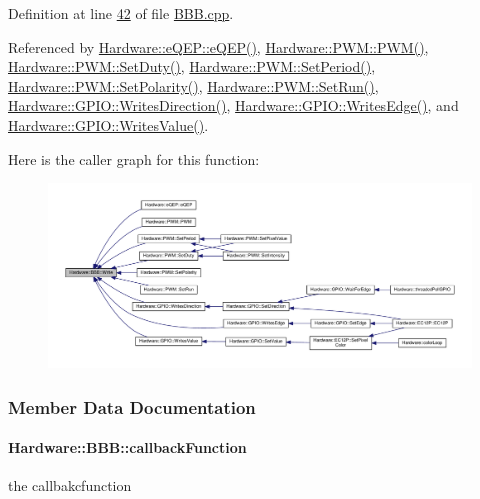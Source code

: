 Definition at line \hyperlink{_b_b_b_8cpp_source_l00042}{42} of file \hyperlink{_b_b_b_8cpp_source}{B\+B\+B.\+cpp}.



Referenced by \hyperlink{eqep_8cpp_source_l00042}{Hardware\+::e\+Q\+E\+P\+::e\+Q\+E\+P()}, \hyperlink{_p_w_m_8cpp_source_l00015}{Hardware\+::\+P\+W\+M\+::\+P\+W\+M()}, \hyperlink{_p_w_m_8cpp_source_l00126}{Hardware\+::\+P\+W\+M\+::\+Set\+Duty()}, \hyperlink{_p_w_m_8cpp_source_l00114}{Hardware\+::\+P\+W\+M\+::\+Set\+Period()}, \hyperlink{_p_w_m_8cpp_source_l00149}{Hardware\+::\+P\+W\+M\+::\+Set\+Polarity()}, \hyperlink{_p_w_m_8cpp_source_l00138}{Hardware\+::\+P\+W\+M\+::\+Set\+Run()}, \hyperlink{_g_p_i_o_8cpp_source_l00213}{Hardware\+::\+G\+P\+I\+O\+::\+Writes\+Direction()}, \hyperlink{_g_p_i_o_8cpp_source_l00237}{Hardware\+::\+G\+P\+I\+O\+::\+Writes\+Edge()}, and \hyperlink{_g_p_i_o_8cpp_source_l00262}{Hardware\+::\+G\+P\+I\+O\+::\+Writes\+Value()}.



Here is the caller graph for this function\+:
\nopagebreak
\begin{figure}[H]
\begin{center}
\leavevmode
\includegraphics[width=350pt]{class_hardware_1_1_b_b_b_a155cc06f76d82a6b690ce5ea08e7c68e_icgraph}
\end{center}
\end{figure}




\subsubsection{Member Data Documentation}
\hypertarget{class_hardware_1_1_b_b_b_a66d583952f3949a732ee15eea81e80e5}{}
\paragraph[{callback\+Function}]{ Hardware\+::\+B\+B\+B\+::callback\+Function\hspace{0.3cm}{\ttfamily [protected]}}\label{class_hardware_1_1_b_b_b_a66d583952f3949a732ee15eea81e80e5}
the callbakcfunction 

